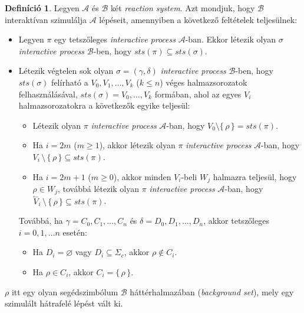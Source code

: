 \documentclass[12pt]{article}
\theoremstyle{definition}
\newtheorem{definition}{Definíció}
\theoremstyle{remark}
\theoremstyle{plain}
\theoremstyle{remark}
\theoremstyle{plain}
\let\emptyset\varnothing
\newcommand{\backwardhat}{\overset{\leftharpoonup}}
\begin{document}
    \begin{definition}\label{def:interactive-simulation}
        Legyen $\mathscr{A}$ és $\mathscr{B}$ két \textit{reaction system}. Azt mondjuk, hogy $\mathscr{B}$ interaktívan szimulálja $\mathscr{A}$ lépéseit, amennyiben a következő feltételek teljesülnek:
        \begin{itemize}
            \item
            Legyen $\pi$ egy tetszőleges \textit{interactive process} $\mathscr{A}$-ban. Ekkor létezik olyan $\sigma$ \textit{interactive process} $\mathscr{B}$-ben, hogy $\textit{sts}(\pi) \subseteq \textit{sts}(\sigma)$.

            \item
            Létezik végtelen sok olyan $\sigma = (\gamma, \delta)$ \textit{interactive process} $\mathscr{B}$-ben, hogy $\textit{sts}(\sigma)$ felírható a $V_{0}, V_{1}, \ldots, V_{k}$ ($k \leq n$) véges halmazsorozatok felhasználásával, $\textit{sts}(\sigma)=V_{0}, \ldots, V_{k}$ formában, ahol az egyes $V_{i}$ halmazsorozatokra a következők egyike teljesül:
            \begin{itemize}
                \item
                Létezik olyan $\pi$ \textit{interactive process} $\mathscr{A}$-ban, hogy $V_{0} \setminus \{ \, \rho \, \} = \textit{sts}(\pi)$.
                
                \item
                Ha $i = 2m$ ($m \geq 1$), akkor létezik olyan $\pi$ \textit{interactive process} $\mathscr{A}$-ban, hogy $V_{i} \,\setminus\, \{ \, \rho \, \}\subseteq \textit{sts}(\pi)$. 
                
                \item
                Ha $i = 2m + 1$ ($m \geq 0$), akkor minden $V_{i}$-beli $W_{j}$ halmazra teljesül, hogy $\rho \in W_{j}$, továbbá létezik olyan $\pi$ \textit{interactive process} $\mathscr{A}$-ban, hogy $\backwardhat V_{i} \,\setminus\, \{ \, \rho \, \} \subseteq \textit{sts}(\pi)$.
            \end{itemize}
            Továbbá, ha $\gamma = C_{0}, C_{1}, \ldots, C_{n}$ és $\delta = D_{0}, D_{1}, \ldots, D_{n}$, akkor tetszőleges $i = 0, 1, \ldots n$ esetén:
            \begin{itemize}
                \item
                Ha $D_{i} = \emptyset$ vagy $D_{i} \subseteq \Sigma_{c}$, akkor $\rho \notin C_{i}$.
                \item
                Ha $\rho \in C_{i}$, akkor $C_{i} = \{ \,\rho\, \}$.
            \end{itemize}

        \end{itemize}
        $\rho$ itt egy olyan segédszimbólum $\mathscr{B}$ háttérhalmazában (\textit{background set}), mely egy szimulált hátrafelé lépést vált ki.
    \end{definition}
\end{document}
